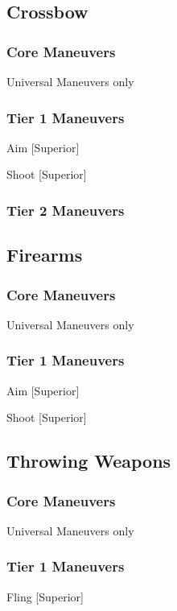 \documentclass[oneside,11pt,english]{book}
\begin{document}
\subsection{Crossbow}
\subsubsection{Core Maneuvers}
Universal Maneuvers only 

\subsubsection{Tier 1 Maneuvers}
Aim [Superior] 

Shoot [Superior]

\subsubsection{Tier 2 Maneuvers}

\subsection{Firearms}
\subsubsection{Core Maneuvers}
Universal Maneuvers only

\subsubsection{Tier 1 Maneuvers}
Aim [Superior]

Shoot [Superior]

\subsection{Throwing Weapons}
\subsubsection{Core Maneuvers}
Universal Maneuvers only

\subsubsection{Tier 1 Maneuvers}
Fling [Superior]
\end{document}
